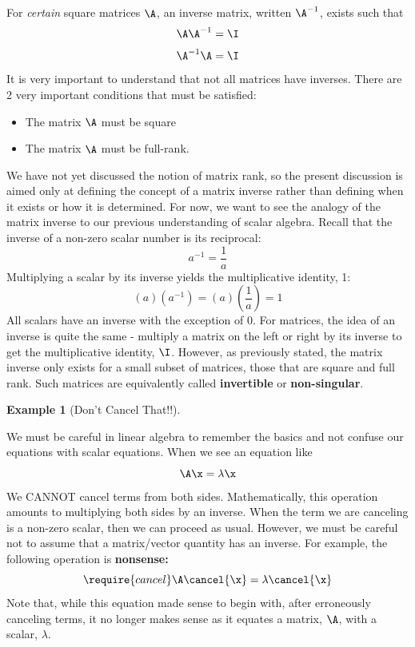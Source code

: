 \documentclass[
]{article}
\theoremstyle{definition}
\theoremstyle{definition}
\newtheorem{example}{Example}[section]
\theoremstyle{definition}
\theoremstyle{definition}
\theoremstyle{remark}
\begin{document}
For \emph{certain} square matrices \(\A\), an inverse matrix, written \(\A^{-1}\), exists such that
\[\A\A^{-1} = \I\]
\[\A^{-1}\A = \I\]
It is very important to understand that not all matrices have inverses. There are 2 very important conditions that must be satisfied:

\begin{itemize}
\item The matrix $\A$ must be square
\item The matrix $\A$ must be full-rank. 
\end{itemize}

We have not yet discussed the notion of matrix rank, so the present discussion is aimed only at defining the concept of a matrix inverse rather than defining when it exists or how it is determined. For now, we want to see the analogy of the matrix inverse to our previous understanding of scalar algebra. Recall that the inverse of a non-zero scalar number is its reciprocal:
\[a^{-1} = \frac{1}{a}\]
Multiplying a scalar by its inverse yields the multiplicative identity, 1:
\[(a)(a^{-1}) = (a)(\frac{1}{a}) = 1\]
All scalars have an inverse with the exception of 0. For matrices, the idea of an inverse is quite the same - multiply a matrix on the left or right by its inverse to get the multiplicative identity, \(\I\). However, as previously stated, the matrix inverse only exists for a small subset of matrices, those that are square and full rank. Such matrices are equivalently called \textbf{invertible} or \textbf{non-singular}.



\begin{example}[Don't Cancel That!!]
\protect\hypertarget{exm:dontcancel}{}\label{exm:dontcancel}

We must be careful in linear algebra to remember the basics and not confuse our equations with scalar equations. When we see an equation like
\[\A\x=\lambda\x\]
We CANNOT cancel terms from both sides. Mathematically, this operation amounts to multiplying both sides by an inverse. When the term we are canceling is a non-zero scalar, then we can proceed as usual. However, we must be careful not to assume that a matrix/vector quantity has an inverse. For example, the following operation is \textbf{nonsense:}
\[\require{cancel} \A\cancel{\x}=\lambda\cancel{\x}\]
Note that, while this equation made sense to begin with, after erroneously canceling terms, it no longer makes sense as it equates a matrix, \(\A\), with a scalar, \(\lambda\).

\end{example}
\end{document}
